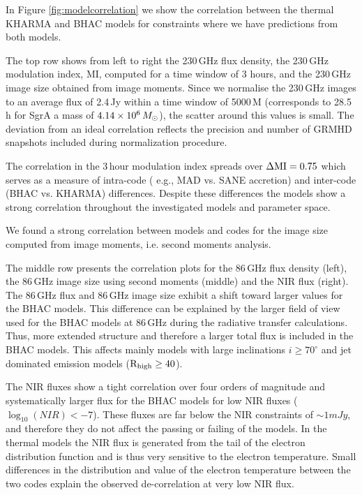 In Figure \ref{fig:modelcorrelation} we show the correlation between the thermal KHARMA and BHAC models for constraints where we have predictions from both models.

The top row shows from left to right the 230\,GHz flux density, the 230\,GHz modulation index, MI, computed for a time window of 3 hours, and the 230\,GHz image size obtained from image moments. Since we normalise the 230\,GHz images to an average flux of 2.4\,Jy within a time window of 5000\,M (corresponds to 28.5 h for SgrA a mass of $4.14\times 10^6\,M_\odot$), the scatter around this values is small. The deviation from an ideal correlation reflects the precision and number of GRMHD snapshots included during normalization procedure.

The correlation in the 3\,hour modulation index spreads over $\Delta \rm{MI}=0.75$ which serves as a measure of intra-code ( e.g., MAD vs. SANE accretion) and inter-code (BHAC vs. KHARMA) differences. Despite these differences the models show a strong correlation throughout the investigated models and parameter space.

We found a strong correlation between models and codes for the image size computed from image moments, i.e. second moments analysis.

The middle row presents the correlation plots for the 86\,GHz flux density (left), the 86\,GHz image size using second moments (middle) and the NIR flux (right). The 86\,GHz flux and 86\,GHz image size exhibit a shift toward larger values for the BHAC models. This difference can be explained by the larger field of view used for the BHAC models at 86\,GHz during the radiative transfer calculations. Thus, more extended structure and therefore a larger total flux is included in the BHAC models. This affects mainly models with large inclinations $i\geq70^\circ$ and jet dominated emission models ($\rm{R}_{\rm high}\geq 40$).

The NIR fluxes show a tight correlation over four orders of magnitude and systematically larger flux for the BHAC models for low NIR fluxes ($\log_{10}(NIR)<-7$). These fluxes are far below the NIR constraints of $\sim 1mJy$, and therefore they do not affect the passing or failing of the models. In the thermal models the NIR flux is generated from the tail of the electron distribution function and is thus very sensitive to the electron temperature. Small differences in the distribution and value of the electron temperature between the two codes explain the observed de-correlation at very low NIR flux. 

